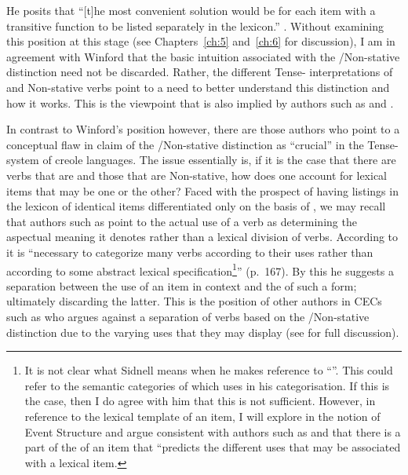 He posits that ``[t]he most convenient solution would be for each item
with a transitive function to be listed separately in the lexicon.”
\citep[196]{Winford1993}.  Without examining this position at this stage (see Chapters~\ref{ch:5} and~\ref{ch:6}
for discussion), I am in agreement with Winford that the
basic intuition associated with the \slash Non-stative distinction
need not be discarded.  Rather, the different Tense-
interpretations of  and Non-stative verbs point to a need to
better understand this distinction and how it works.  This is the
viewpoint that is also implied by authors such as \citet{Andersen1990}
and \citet{Gooden2008}.

In contrast to Winford’s position however, there are those authors who
point to a conceptual flaw in  claim of the
\slash Non-stative distinction as ``crucial'' in the Tense-
system of creole languages.  The issue essentially is, if it is the
case that there are verbs that are  and those that are
Non-stative, how does one account for lexical items that may be one or
the other?  Faced with the prospect of having listings in the lexicon
of identical items differentiated only on the basis of , we
may recall that authors such as \citet{Sidnell2002} point to the
actual use of a verb as determining the aspectual meaning it denotes
rather than a lexical division of verbs.  According to
\citet[167]{Sidnell2002} it is ``necessary to categorize many verbs
according to their uses rather than according to some abstract lexical
specification\footnote{It is not clear what Sidnell means when he
  makes reference to ``''. This could refer to the
  semantic categories of \citet{Dixon1977} which \citet{Winford1993}
  uses in his categorisation. If this is the case, then I do agree
  with him that this is not sufficient. However, in reference to the
  lexical template of an item, I will explore in  the
  notion of Event Structure and argue consistent with authors such as
  \citet{Pustejovsky1991} and \citet{Levin1993} that there is a part
  of the  of an item that ``predicts the different
  uses that may be associated with a lexical item.}” (p.~167).  By
this he suggests a separation between the use of an item in context
and the  of such a form; ultimately discarding
the latter.  This is the position of other authors in CECs such as
\citet{Jaganauth1987} who argues against a separation of verbs based
on the \slash Non-stative distinction due to the varying uses that
they may display (see  for full
discussion).

